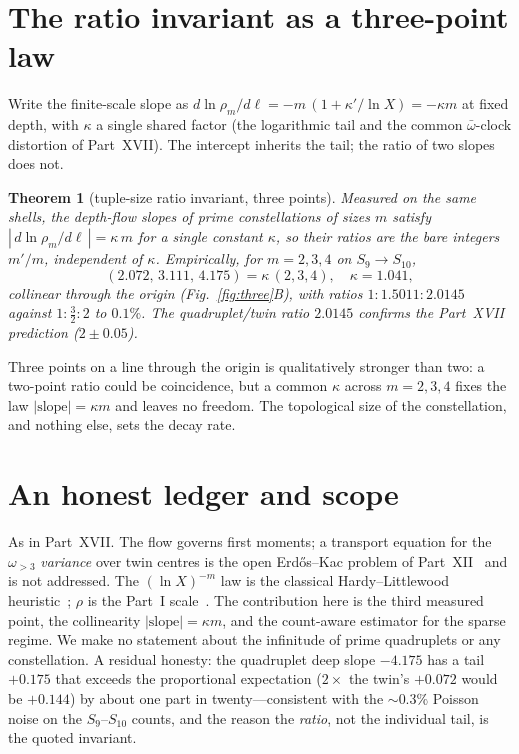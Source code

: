 \documentclass[11pt]{article}
\newtheorem{theorem}{Theorem}
\begin{document}
\section{The ratio invariant as a three-point law}

Write the finite-scale slope as $d\ln\rho_m/d\ell=-m\,(1+\kappa'/\ln X)=-\kappa
m$ at fixed depth, with $\kappa$ a single shared factor (the logarithmic tail and
the common $\bar\omega$-clock distortion of Part~XVII). The intercept inherits the
tail; the ratio of two slopes does not.

\begin{theorem}[tuple-size ratio invariant, three points]\label{thm:ratio}
Measured on the same shells, the depth-flow slopes of prime constellations of
sizes $m$ satisfy $|\,d\ln\rho_m/d\ell\,|=\kappa\,m$ for a single constant
$\kappa$, so their ratios are the bare integers $m'/m$, independent of $\kappa$.
Empirically, for $m=2,3,4$ on $S_9\!\to\!S_{10}$,
\[
  (2.072,\,3.111,\,4.175)=\kappa\,(2,3,4),\quad \kappa=1.041,
\]
collinear through the origin (Fig.~\ref{fig:three}B), with ratios
$1:1.5011:2.0145$ against $1:\tfrac32:2$ to $0.1\%$. The quadruplet/twin ratio
$2.0145$ confirms the Part~XVII prediction ($2\pm0.05$).
\end{theorem}

Three points on a line through the origin is qualitatively stronger than two: a
two-point ratio could be coincidence, but a common $\kappa$ across $m=2,3,4$ fixes
the law $|\text{slope}|=\kappa m$ and leaves no freedom. The topological size of
the constellation, and nothing else, sets the decay rate.

\section{An honest ledger and scope}

As in Part~XVII. The flow governs first moments; a transport equation for the
$\omega_{>3}$ \emph{variance} over twin centres is the open Erd\H{o}s--Kac problem
of Part~XII~\cite{ChenXII} and is not addressed. The $(\ln X)^{-m}$ law is the
classical Hardy--Littlewood heuristic~\cite{HL}; $\rho$ is the Part~I
scale~\cite{ChenI}. The contribution here is the third measured point, the
collinearity $|\text{slope}|=\kappa m$, and the count-aware estimator for the
sparse regime. We make no statement about the infinitude of prime quadruplets or
any constellation. A residual honesty: the quadruplet deep slope $-4.175$ has a
tail $+0.175$ that exceeds the proportional expectation ($2\times$ the twin's
$+0.072$ would be $+0.144$) by about one part in twenty---consistent with the
$\sim0.3\%$ Poisson noise on the $S_9$--$S_{10}$ counts, and the reason the
\emph{ratio}, not the individual tail, is the quoted invariant.
\end{document}
